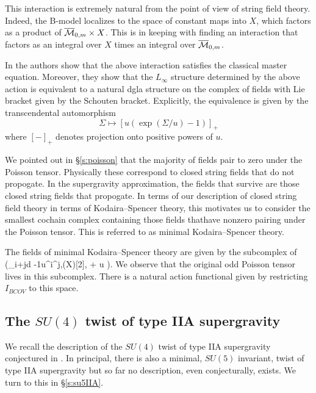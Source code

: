 This interaction is extremely natural from the point of view of string field theory. Indeed, the B-model localizes to the space of constant maps into $X$, which factors as a product of $\overline{\mathcal M}_{0,m}\times X$. This is in keeping with finding an interaction that factors as an integral over $X$ times an integral over $\overline{\mathcal M}_{0,m}$. 

In \cite{BCOV} the authors show that the above interaction satisfies the classical master equation. Moreover, they show that the $L_\infty$ structure determined by the above action is equivalent to a natural dgla structure on the complex of fields with Lie bracket given by the Schouten bracket. Explicitly, the equivalence is given by the transcendental automorphism 
\[
\Sigma \mapsto [u(\exp (\Sigma/u)-1)]_+
\]
where $[-]_+$ denotes projection onto positive powers of $u$.

\parsec[s:minimalks]

We pointed out in \S\ref{s:poisson} that the majority of fields pair to zero under the Poisson tensor. Physically these correspond to closed string fields that do not propogate. In the supergravity approximation, the fields that survive are those closed string fields that propogate. In terms of our description of closed string field theory in terms of Kodaira--Spencer theory, this motivates us to consider the smallest cochain complex containing those fields thathave nonzero pairing under the Poisson tensor. This is referred to as minimal Kodaira--Spencer theory.

The fields of minimal Kodaira--Spencer theory are given by the subcomplex of \label{eqn:ks1}
\beqn
\left (\bigoplus_{i+j\leq d -1}u^i\PV^{j,\bu}(X)[2], \dbar + u \div\right).
\eeqn
We observe that the original odd Poisson tensor lives in this subcomplex. 
There is a natural action functional given by restricting $I_{BCOV}$ to this space.

\subsection{The $SU(4)$ twist of type IIA supergravity}\label{sec:SU(4)twist}

We recall the description of the $SU(4)$ twist of type IIA supergravity conjectured in \cite{CLsugra}. 
In principal, there is also a minimal, $SU(5)$ invariant, twist of type IIA supergravity but so far no description, even conjecturally, exists.
We turn to this in \S \ref{s:su5IIA}. 

